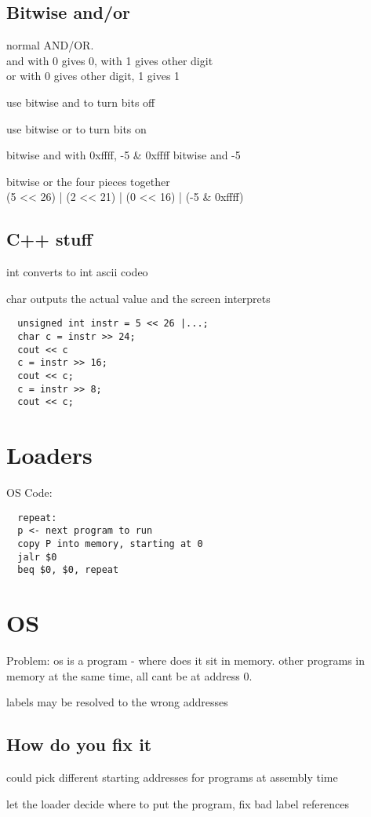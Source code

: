 \documentclass[11pt]{amsart}
\begin{document}
\subsection{Bitwise and/or}
\par normal AND/OR. \\and with 0 gives 0, with 1 gives other digit\\ or with 0
gives other digit, 1 gives 1
\par use bitwise and to turn bits off
\par use bitwise or to turn bits on
\par bitwise and with 0xffff, -5 \& 0xffff bitwise and -5
\par bitwise or the four pieces together \\
(5 << 26) | (2 << 21) | (0 << 16) | (-5 \& 0xffff)
\subsection{C++ stuff}
\par int converts to int ascii codeo
\par char outputs the actual value and the screen interprets
\begin{verbatim}
  unsigned int instr = 5 << 26 |...;
  char c = instr >> 24;
  cout << c
  c = instr >> 16;
  cout << c;
  c = instr >> 8;
  cout << c;
\end{verbatim}
\section{Loaders}
\par OS Code:
\begin{verbatim}
  repeat:
  p <- next program to run
  copy P into memory, starting at 0
  jalr $0
  beq $0, $0, repeat
\end{verbatim}
\section{OS}
\par Problem: os is a program - where does it sit in memory. other programs in
memory at the same time, all cant be at address 0.
\par labels may be resolved to the wrong addresses
\subsection{How do you fix it}
\par could pick different starting addresses for programs at assembly time
\par let the loader decide where to put the program, fix bad label references
\end{document}
